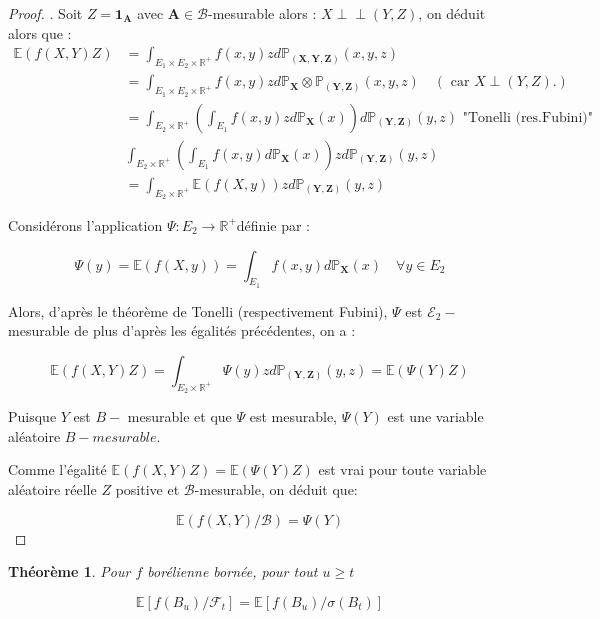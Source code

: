 \documentclass[A4paper,12pt]{report}
\def\Perp{\perp\!\!\!\perp}
\newtheorem{theorem}{Th\'eor\`eme}[chapter]
\begin{document}
\begin{proof}
. Soit $Z=\mathbf{1}_{\mathbf{A}}$ avec $\mathbf{A} \in \mathcal{B}$-mesurable alors : $X \Perp(Y, Z)$, on déduit alors que :
$$
\begin{aligned}
\mathbb{E}(f(X, Y) Z) & =\int_{E_{1} \times E_{2} \times \mathbb{R}^{+}} f(x, y) z d \mathbb{P}_{(\mathbf{X}, \mathbf{Y}, \mathbf{Z})}(x, y, z) \\
& =\int_{E_{1} \times E_{2} \times \mathbb{R}^{+}} f(x, y) z d \mathbb{P}_{\mathbf{X}} \otimes \mathbb{P}_{(\mathbf{Y}, \mathbf{Z})}(x, y, z) \quad(\text { car } X \perp(Y, Z) .) \\
& =\int_{E_{2} \times \mathbb{R}^{+}}\left(\int_{E_{1}} f(x, y) z d \mathbb{P}_{\mathbf{X}}(x)\right) d \mathbb{P}_{(\mathbf{Y}, \mathbf{Z})}(y, z) \text { "Tonelli (res.Fubini)" } \\
& \int_{E_{2} \times \mathbb{R}^{+}}\left(\int_{E_{1}} f(x, y) d \mathbb{P}_{\mathbf{X}}(x)\right) z d \mathbb{P}_{(\mathbf{Y}, \mathbf{Z})}(y, z) \\
& =\int_{E_{2} \times \mathbb{R}^{+}} \mathbb{E}(f(X, y)) z d \mathbb{P}_{(\mathbf{Y}, \mathbf{Z})}(y, z)
\end{aligned}
$$

Considérons l'application $\Psi: E_{2} \longrightarrow \mathbb{R}^{+}$définie par :

$$
\Psi(y)=\mathbb{E}(f(X, y))=\int_{E_{1}} f(x, y) d \mathbb{P}_{\mathbf{X}}(x) \quad \forall y \in E_{2}
$$

Alors, d'après le théorème de Tonelli (respectivement Fubini), $\Psi$ est $\mathcal{E}_{2}-$ mesurable de plus d'après les égalités précédentes, on a :

$$
\mathbb{E}(f(X, Y) Z)=\int_{E_{2} \times \mathbb{R}^{+}} \Psi(y) z d \mathbb{P}_{(\mathbf{Y}, \mathbf{Z})}(y, z)=\mathbb{E}(\Psi(Y) Z)
$$

Puisque $Y$ est $B-$ mesurable et que $\Psi$ est mesurable, $\Psi(Y)$ est une variable aléatoire $B-m e s u r a b l e$.

Comme l'égalité $\mathbb{E}(f(X, Y) Z)=\mathbb{E}(\Psi(Y) Z)$ est vrai pour toute variable aléatoire réelle $Z$ positive et $\mathcal{B}$-mesurable, on déduit que:

$$
\mathbb{E}(f(X, Y)/\mathcal{B})=\Psi(Y)
$$
\end{proof}
\begin{theorem}
 Pour $f$ borélienne bornée, pour tout $u \geq t$

$$
\mathbb{E}\left[f\left(B_{u}\right) / \mathcal{F}_{t}\right]=\mathbb{E}\left[f\left(B_{u}\right) / \sigma\left(B_{t}\right)\right]
$$
\end{theorem}
\end{document}
